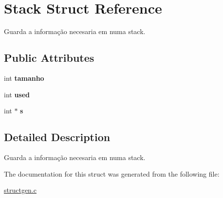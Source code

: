 \hypertarget{structStack}{}\section{Stack Struct Reference}
\label{structStack}


Guarda a informação necesaria em numa stack.  


\subsection*{Public Attributes}
\begin{DoxyCompactItemize}
\item 
int {\bfseries tamanho}\hypertarget{structStack_a51d514b2c5b69d28bd91d3e69541d889}{}\label{structStack_a51d514b2c5b69d28bd91d3e69541d889}

\item 
int {\bfseries used}\hypertarget{structStack_aa27adf116a06308fb49975bdb206601a}{}\label{structStack_aa27adf116a06308fb49975bdb206601a}

\item 
int $\ast$ {\bfseries s}\hypertarget{structStack_a42232a9b28062f38dc9655518d32b65e}{}\label{structStack_a42232a9b28062f38dc9655518d32b65e}

\end{DoxyCompactItemize}


\subsection{Detailed Description}
Guarda a informação necesaria em numa stack. 

The documentation for this struct was generated from the following file\+:\begin{DoxyCompactItemize}
\item 
\hyperlink{structgen_8c}{structgen.\+c}\end{DoxyCompactItemize}
